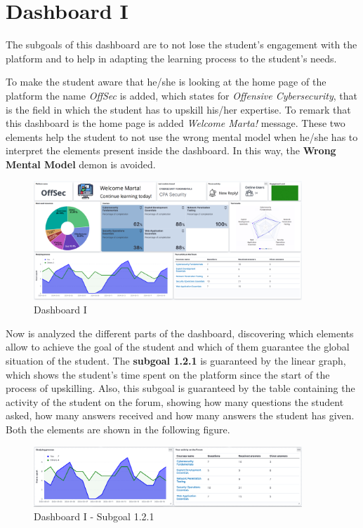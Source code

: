 \section{Dashboard I}

The subgoals of this dashboard are to not lose the student's engagement with 
the platform and to help in adapting the learning process to the student's
needs. 

To make the student aware that he/she is looking
at the home page of the platform the name \textit{OffSec} is added,
which states for \textit{Offensive Cybersecurity}, that is the field
in which the student has to upskill his/her expertise. To remark that this
dashboard is the home page is added \textit{Welcome Marta!} message.
These two elements help the student to not use the wrong mental model
when he/she has to interpret the elements present inside the dashboard.
In this way, the \textbf{Wrong Mental Model} demon is avoided.

\begin{figure}[H]
    \centering
    \includegraphics[width=0.9\textwidth]{assets/dashboard_1.png}
    \caption{Dashboard I}
    \label{fig:dashboard_1}
\end{figure}

Now is analyzed the different parts of the dashboard, discovering which
elements allow to achieve the goal of the student and which of them guarantee the
global situation of the student. The \textbf{subgoal 1.2.1} is guaranteed by the linear graph,
which shows the student's time spent on the platform since the start of
the process of upskilling. Also, this subgoal is guaranteed by the table containing the activity of the
student on the forum, showing how many questions the student asked, how many
answers received and how many answers the student has given. 
Both the elements are shown in the following figure.

\begin{figure}[H]
    \centering
    \includegraphics[width=0.9\textwidth]{assets/dashboard_1_121.png}
    \caption{Dashboard I - Subgoal 1.2.1}
    \label{fig:dashboard_1_subgoal_121}
\end{figure}



